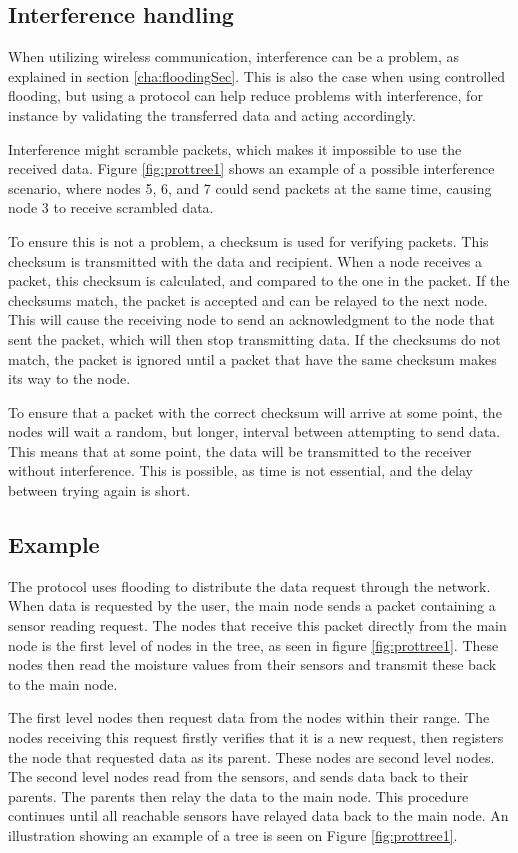 \subsection{Interference handling} \label{cha:crcDesign}
When utilizing wireless communication, interference can be a problem, as explained in section \ref{cha:floodingSec}. This is also the case when using controlled flooding, but using a protocol can help reduce problems with interference, for instance by validating the transferred data and acting accordingly.

Interference might scramble packets, which makes it impossible to use the received data. Figure \ref{fig:prottree1} shows an example of a possible interference scenario, where nodes 5, 6, and 7 could send packets at the same time, causing node 3 to receive scrambled data.

To ensure this is not a problem, a checksum is used for verifying packets. This checksum is transmitted with the data and recipient. When a node receives a packet, this checksum is calculated, and compared to the one in the packet. If the checksums match, the packet is accepted and can be relayed to the next node. This will cause the receiving node to send an acknowledgment to the node that sent the packet, which will then stop transmitting data.
If the checksums do not match, the packet is ignored until a packet that have the same checksum makes its way to the node. 

To ensure that a packet with the correct checksum will arrive at some point, the nodes will wait a random, but longer, interval between attempting to send data. This means that at some point, the data will be transmitted to the receiver without interference.
This is possible, as time is not essential, and the delay between trying again is short.


\subsection*{Example}
The protocol uses flooding to distribute the data request through the network. 
When data is requested by the user, the main node sends a packet containing a sensor reading request. 
The nodes that receive this packet directly from the main node is the first level of nodes in the tree, as seen in figure \ref{fig:prottree1}. 
These nodes then read the moisture values from their sensors and transmit these back to the main node. 

The first level nodes then request data from the nodes within their range. 
The nodes receiving this request firstly verifies that it is a new request, then registers the node that requested data as its parent. 
These nodes are second level nodes. The second level nodes read from the sensors, and sends data back to their parents. The parents then relay the data to the main node. 
This procedure continues until all reachable sensors have relayed data back to the main node.
An illustration showing an example of a tree is seen on Figure \ref{fig:prottree1}.

